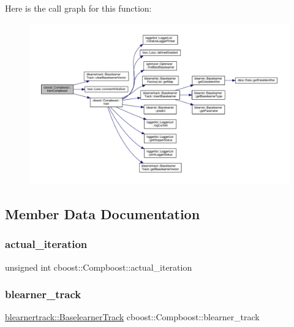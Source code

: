 Here is the call graph for this function\+:\nopagebreak
\begin{figure}[H]
\begin{center}
\leavevmode
\includegraphics[width=350pt]{classcboost_1_1_compboost_a52ea04dec53c68865fdc4a79461d17cb_cgraph}
\end{center}
\end{figure}


\subsection{Member Data Documentation}
\mbox{\label{classcboost_1_1_compboost_a3db81c285c1cd238d0fb65dfc6c00439}} 
\subsubsection{\texorpdfstring{actual\+\_\+iteration}{actual\_iteration}}
{\footnotesize\ttfamily unsigned int cboost\+::\+Compboost\+::actual\+\_\+iteration\hspace{0.3cm}{\ttfamily [private]}}

\mbox{\label{classcboost_1_1_compboost_af9c2787818f591941f74af0059ca7dc9}} 
\subsubsection{\texorpdfstring{blearner\+\_\+track}{blearner\_track}}
{\footnotesize\ttfamily \hyperlink{classblearnertrack_1_1_baselearner_track}{blearnertrack\+::\+Baselearner\+Track} cboost\+::\+Compboost\+::blearner\+\_\+track\hspace{0.3cm}{\ttfamily [private]}}

